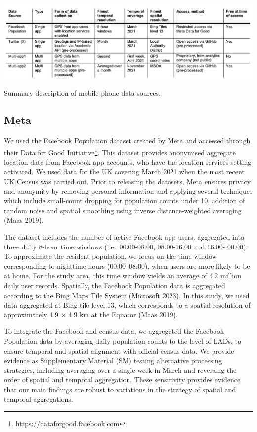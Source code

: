 \documentclass{article}
\begin{document}
\begin{table}[h]
\centering
\includegraphics[width=1\linewidth]{figures/table-data-source.png}
\caption{Summary description of mobile phone data sources.}
\label{tab:data-source}
\end{table}

\subsection{Meta}\label{meta}

We used the Facebook Population dataset created by Meta and accessed
through their Data for Good Initiative\footnote{\url{https://dataforgood.facebook.com}}. This dataset provides
anonymised aggregate location data from Facebook app accounts, who have
the location services setting activated.
We used data for the UK covering March 2021 when the most recent UK
Census was carried out. Prior to releasing the datasets, Meta ensures
privacy and anonymity by removing personal information and applying
several techniques which include small-count dropping for population
counts under 10, addition of random noise and spatial smoothing using
inverse distance-weighted averaging (Maas 2019).

The dataset includes the number of active Facebook app users, aggregated
into three daily 8-hour time windows (i.e.~00:00-08:00, 08:00-16:00 and
16:00- 00:00). To approximate the resident population, we focus on the
time window corresponding to nighttime hours (00:00--08:00), when users
are more likely to be at home. For the study area, this time window
yields an average of 4.2 million daily user records. Spatially, the
Facebook Population data is aggregated according to the Bing Maps Tile
System (Microsoft 2023). In this study, we used data aggregated
at Bing tile level 13, which corresponds to a spatial resolution of
approximately 4.9 \(\times\) 4.9 km at the Equator (Maas 2019).

To integrate the Facebook and census data, we aggregated the Facebook
Population data by averaging daily population counts to the level of
LADs, to ensure temporal and spatial alignment with official census
data. We provide evidence as Supplementary Material (SM) testing
alternative processing strategies, including averaging over a single
week in March and reversing the order of spatial and temporal
aggregation. These sensitivity provides evidence that our main findings
are robust to variations in the strategy of spatial and temporal
aggregations.
\end{document}

